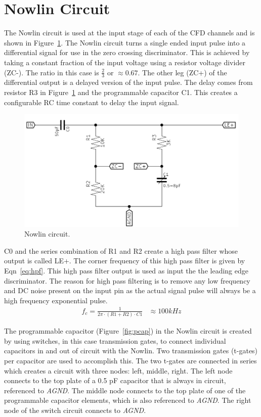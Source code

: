 \documentclass[12pt,oneside,final]{siuethesis}
\theoremstyle{definition}
\begin{document}
\section{Nowlin Circuit}
\par The Nowlin circuit is used at the input stage of each of the CFD channels and is shown in Figure~\ref{fig:Nowlin}. The Nowlin circuit turns a single ended input pulse into a differential signal for use in the zero crossing discriminator. This is achieved by taking a constant fraction of the input voltage using a resistor voltage divider (ZC-). The ratio in this case is $\frac{2}{3}$ or $\approx 0.67$. The other leg (ZC+) of the differential output is a delayed version of the input pulse. The delay comes from resistor R3 in Figure~\ref{fig:Nowlin} and the programmable capacitor C1. This creates a configurable RC time constant to delay the input signal. 
\begin{figure}[ht]
\centering
\includegraphics[scale=.6,keepaspectratio=true]{images/nowlin_circuit.png} 
\caption{Nowlin circuit.}
\label{fig:Nowlin}
\end{figure}
\par C0 and the series combination of R1 and R2 create a high pass filter whose output is called LE+. The corner frequency of this high pass filter is given by Eqn~\ref{eq:hpf}. This high pass filter output is used as input the the leading edge discriminator. The reason for high pass filtering is to remove any low frequency and DC noise present on the input pin as the actual signal pulse will always be a high frequency exponential pulse.
\begin{align}
f_{c} = \frac{1}{2\pi \cdot(R1+R2)\cdot C1} &\approx 100 kHz
\label{eq:hpf}
\end{align}
\par The programmable capacitor (Figure~\ref{fig:pcap}) in the Nowlin circuit is created by using switches, in this case transmission gates, to connect individual capacitors in and out of circuit with the Nowlin. Two transmission gates (t-gates) per capacitor are used to accomplish this. The two t-gates are connected in series which creates a circuit with three nodes: left, middle, right. The left node connects to the top plate of a 0.5 pF capacitor that is always in circuit, referenced to \emph{AGND}. The middle node connects to the top plate of one of the programmable capacitor elements, which is also referenced to \emph{AGND}. The right node of the switch circuit connects to \emph{AGND}.
\end{document}
